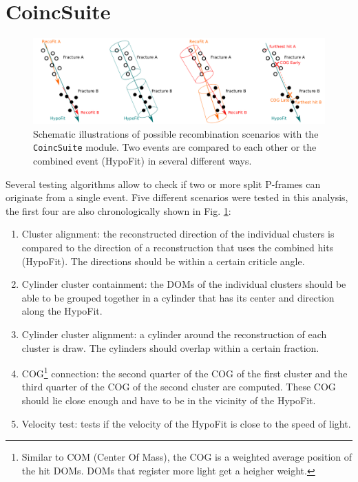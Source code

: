 \section{CoincSuite}
\begin{figure}[t]
\centering
\includegraphics[width=\textwidth]{chapter7/img/coincsuite.png}
\caption{Schematic illustrations of possible recombination scenarios with the \texttt{CoincSuite} module. Two events are compared to each other or the combined event (HypoFit) in several different ways.}
\label{fig:coincsuite}
\end{figure}
Several testing algorithms allow to check if two or more split P-frames can originate from a single event. Five different scenarios were tested in this analysis, the first four are also chronologically shown in Fig. \ref{fig:coincsuite}:
\vspace{2mm}

\begin{enumerate}
\item Cluster alignment: the reconstructed direction of the individual clusters is compared to the direction of a reconstruction that uses the combined hits (HypoFit). The directions should be within a certain criticle angle.
\item Cylinder cluster containment: the DOMs of the individual clusters should be able to be grouped together in a cylinder that has its center and direction along the HypoFit.
\item Cylinder cluster alignment: a cylinder around the reconstruction of each cluster is draw. The cylinders should overlap within a certain fraction.
\item COG\footnote{Similar to COM (Center Of Mass), the COG is a weighted average position of the hit DOMs. DOMs that register more light get a heigher weight.} connection: the second quarter of the COG of the first cluster and the third quarter of the COG of the second cluster are computed. These COG should lie close enough and have to be in the vicinity of the HypoFit.
\item Velocity test: tests if the velocity of the HypoFit is close to the speed of light.
\end{enumerate}

